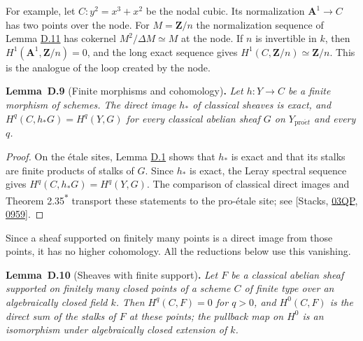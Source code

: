 \documentclass[11pt]{article}
\newenvironment{bpstatement}[2]{\par\addvspace{0.6\baselineskip}\noindent\textbf{#1}#2\textbf{.}\enspace\ignorespaces}
  {\par\addvspace{0.4\baselineskip}}
\newenvironment{bpstatementit}[2]{\begin{bpstatement}{#1}{#2}\itshape\ignorespaces}{\end{bpstatement}}
\newcommand{\bpout}[1]{#1\textsuperscript{\hyperlink{bp-outside}{\ensuremath{\ast}}}}
\begin{document}
For example, let \(C:y^2=x^3+x^2\) be the nodal cubic. Its normalization \(\mathbf A^1\to C\) has two points over the node. For \(M=\mathbf Z/n\) the normalization sequence of Lemma \hyperref[bp36]{D.11} has cokernel \(M^2/\Delta M\simeq M\) at the node. If \(n\) is invertible in \(k\), then \(H^1(\mathbf A^1,\mathbf Z/n)=0\), and the long exact sequence gives \(H^1(C,\mathbf Z/n)\simeq\mathbf Z/n\). This is the analogue of the loop created by the node.

\label{bp30}%
\begin{bpstatementit}{Lemma~D.9}{ (Finite morphisms and cohomology)}
Let \(h:Y\to C\) be a finite morphism of schemes. The direct image \(h_*\) of classical sheaves is exact, and \(H^q(C,h_*G)=H^q(Y,G)\) for every classical abelian sheaf \(G\) on \(Y_{\mathrm{pro}\acute{e}t}\) and every \(q\).
\end{bpstatementit}

\begin{proof}[{Proof}]\label{bp31}%
On the étale sites, Lemma \hyperref[bp3]{D.1} shows that \(h_*\) is exact and that its stalks are finite products of stalks of \(G\).  Since \(h_*\) is exact, the Leray spectral sequence gives \(H^q(C,h_*G)=H^q(Y,G)\).  The comparison of classical direct images and Theorem \bpout{2.35} transport these statements to the pro-étale site; see [Stacks, \href{https://stacks.math.columbia.edu/tag/03QP}{03QP}, \href{https://stacks.math.columbia.edu/tag/0959}{0959}].
\end{proof}

\label{bp32}%
Since a sheaf supported on finitely many points is a direct image from those points, it has no higher cohomology. All the reductions below use this vanishing.

\label{bp33}%
\begin{bpstatementit}{Lemma~D.10}{ (Sheaves with finite support)}
Let \(F\) be a classical abelian sheaf supported on finitely many closed points of a scheme \(C\) of finite type over an algebraically closed field \(k\). Then \(H^q(C,F)=0\) for \(q>0\), and \(H^0(C,F)\) is the direct sum of the stalks of \(F\) at these points; the pullback map on \(H^0\) is an isomorphism under algebraically closed extension of \(k\).
\end{bpstatementit}
\end{document}
